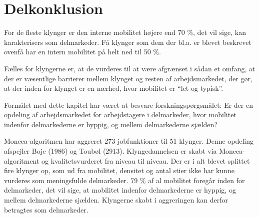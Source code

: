 \section{Delkonklusion \label{}}
For de fleste klynger er den interne mobilitet højere end 70 \%, det vil sige, kan karakterisers som delmarkeder. Få klynger som dem der bl.a. er blevet beskrevet ovenfå har en intern mobilitet på helt ned til 50 \%. 


Fælles for klyngerne er, at de vurderes til at være afgrænset i sådan et omfang, at der er væsentlige barrierer mellem klynget og resten af arbejdsmarkedet, der gør, at der inden for klynget er en nærhed, hvor mobilitet er “let og typisk”.

Formålet med dette kapitel har været at besvare forskningspørgsmålet: Er der en opdeling af arbejdsmarkedet for arbejdstagere i delmarkeder, hvor mobilitet indenfor delmarkederne er hyppig, og mellem delmarkederne sjælden?

Moneca-algoritmen har aggreret 273 jobfunktioner til 51 klynger. Denne opdeling afspejler Boje (1986) og Toubøl (2913). Klyngedannelsen er skabt via Moneca-algoritment og kvalitetsvurderet fra niveau til niveau. Der er i alt blevet splittet fire klynger op, som ud fra mobilitet, densitet og antal stier ikke har kunne vurderes som meningsfulde delmarkeder. 79 \% af al mobilitet foregår inden for delmarkeder, det vil sige, at mobilitet indenfor delmarkederne er hyppig, og mellem delmarkederne sjælden. Klyngerne skabt i aggreringen kan derfor betragtes som delmarkeder.



% 
% 
%
%
%
%
%
%
%
%
%
%
%
%
%
%
%
%
